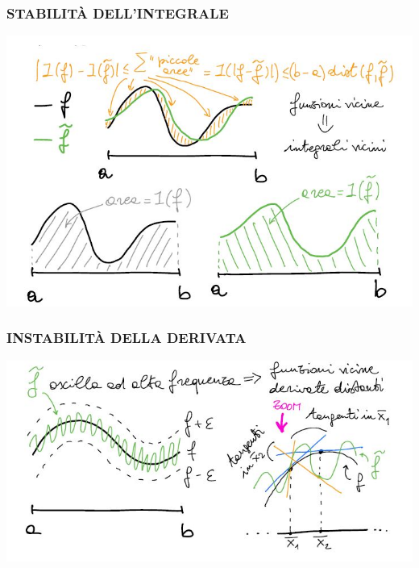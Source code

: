 \documentclass[12pt,a4paper]{article}
\begin{document}
\subsubsection{STABILITÀ DELL'INTEGRALE}
\begin{center}
    \includegraphics[scale=0.6]{calcolo5.JPG}
\end{center}
\subsubsection{INSTABILITÀ DELLA DERIVATA}
\begin{center}
    \includegraphics[scale=0.6]{calcolo55.JPG}
\end{center}
\end{document}
